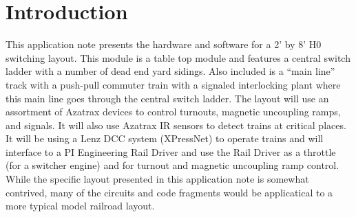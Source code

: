 
\chapter{Introduction}
\label{chapt:Introduction}

This application note presents the hardware and software for a 2' by 8'
H0 switching layout.  This module is a table top module and features a
central switch ladder with a number of dead end yard sidings.  Also
included is a ``main line'' track with a push-pull commuter train with
a signaled interlocking plant where this main line goes through the
central switch ladder.  The layout will use an assortment of Azatrax
devices to control turnouts, magnetic uncoupling ramps, and signals. It
will also use Azatrax IR sensors to detect trains at critical places.
It will be using a Lenz DCC system (XPressNet) to operate trains and
will interface to a PI Engineering Rail Driver and use the Rail Driver
as a throttle (for a switcher engine) and for turnout and magnetic
uncoupling ramp control.  While the specific layout presented in this
application note is somewhat contrived, many of the circuits and code
fragments would be applicatical to a more typical model railroad layout.



